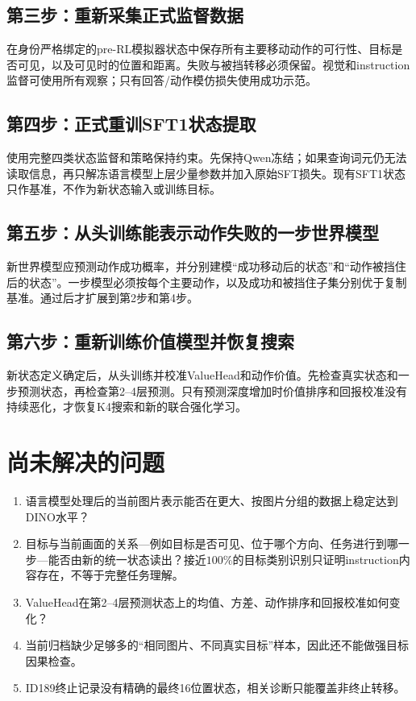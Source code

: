\documentclass[UTF8,11pt,a4paper,fontset=none]{ctexart}
\begin{document}
\subsection{第三步：重新采集正式监督数据}

在身份严格绑定的pre-RL模拟器状态中保存所有主要移动动作的可行性、目标是否可见，以及可见时的位置和距离。失败与被挡转移必须保留。视觉和instruction监督可使用所有观察；只有回答/动作模仿损失使用成功示范。

\subsection{第四步：正式重训SFT1状态提取}

使用完整四类状态监督和策略保持约束。先保持Qwen冻结；如果查询词元仍无法读取信息，再只解冻语言模型上层少量参数并加入原始SFT损失。现有SFT1状态只作基准，不作为新状态输入或训练目标。

\subsection{第五步：从头训练能表示动作失败的一步世界模型}

新世界模型应预测动作成功概率，并分别建模“成功移动后的状态”和“动作被挡住后的状态”。一步模型必须按每个主要动作，以及成功和被挡住子集分别优于复制基准。通过后才扩展到第2步和第4步。

\subsection{第六步：重新训练价值模型并恢复搜索}

新状态定义确定后，从头训练并校准ValueHead和动作价值。先检查真实状态和一步预测状态，再检查第2--4层预测。只有预测深度增加时价值排序和回报校准没有持续恶化，才恢复K4搜索和新的联合强化学习。

\section{尚未解决的问题}

\begin{enumerate}
  \item 语言模型处理后的当前图片表示能否在更大、按图片分组的数据上稳定达到DINO水平？
  \item 目标与当前画面的关系---例如目标是否可见、位于哪个方向、任务进行到哪一步---能否由新的统一状态读出？接近$100\%$的目标类别识别只证明instruction内容存在，不等于完整任务理解。
  \item ValueHead在第2--4层预测状态上的均值、方差、动作排序和回报校准如何变化？
  \item 当前归档缺少足够多的“相同图片、不同真实目标”样本，因此还不能做强目标因果检查。
  \item ID189终止记录没有精确的最终16位置状态，相关诊断只能覆盖非终止转移。
\end{enumerate}
\end{document}
